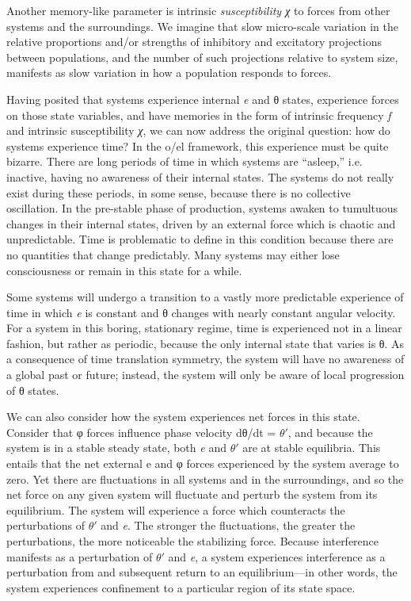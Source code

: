   Another memory-like parameter is intrinsic \textit{susceptibility χ} to forces from other systems and the surroundings. We imagine that slow micro-scale variation in the relative proportions and/or strengths of inhibitory and excitatory projections between populations, and the number of such projections relative to system size, manifests as slow variation in how a population responds to forces.

  Having posited that systems experience internal \textit{e} and θ states, experience forces on those state variables, and have memories in the form of intrinsic frequency \textit{f} and intrinsic susceptibility \textit{χ}, we can now address the original question: how do systems experience time? In the o/el framework, this experience must be quite bizarre. There are long periods of time in which systems are “asleep,” i.e. inactive, having no awareness of their internal states. The systems do not really exist during these periods, in some sense, because there is no collective oscillation. In the pre-stable phase of production, systems awaken to tumultuous changes in their internal states, driven by an external force which is chaotic and unpredictable. Time is problematic to define in this condition because there are no quantities that change predictably. Many systems may either lose consciousness or remain in this state for a while. 

  Some systems will undergo a transition to a vastly more predictable experience of time in which \textit{e} is constant and θ changes with nearly constant angular velocity. For a system in this boring, stationary regime, time is experienced not in a linear fashion, but rather as periodic, because the only internal state that varies is θ. As a consequence of time translation symmetry, the system will have no awareness of a global past or future; instead, the system will only be aware of local progression of θ states. 

  We can also consider how the system experiences net forces in this state. Consider that φ forces influence phase velocity dθ/dt = $\theta ′$, and because the system is in a stable steady state, both \textit{e} and $\theta ′$ are at stable equilibria. This entails that the net external e and φ forces experienced by the system average to zero. Yet there are fluctuations in all systems and in the surroundings, and so the net force on any given system will fluctuate and perturb the system from its equilibrium. The system will experience a force which counteracts the perturbations of $\theta ′$ and \textit{e}. The stronger the fluctuations, the greater the perturbations, the more noticeable the stabilizing force. Because interference manifests as a perturbation of $\theta ′$ and \textit{e}, a system experiences interference as a perturbation from and subsequent return to an equilibrium—in other words, the system experiences confinement to a particular region of its state space.

